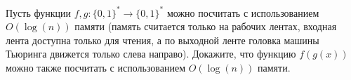 Пусть функции $f, g: \{0, 1\}^* \rightarrow \{0, 1\}^*$ можно посчитать с использованием $O(\log(n))$
памяти (память считается только на рабочих лентах, входная лента доступна только для чтения, а по
выходной ленте головка машины Тьюринга движется только слева направо). Докажите, что функцию $f(g(x))$
можно также посчитать с использованием $O(\log(n))$ памяти.
